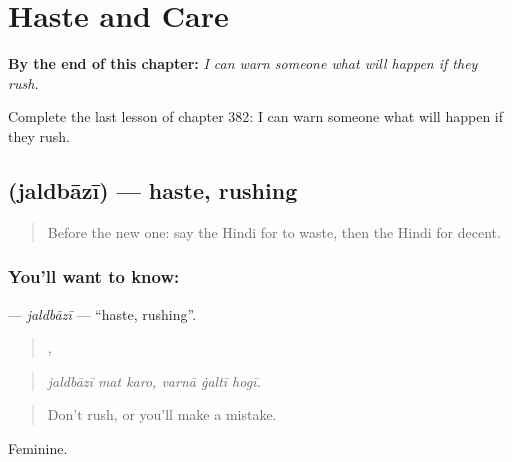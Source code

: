 
\chapter{Haste and Care}
\label{ch:hi-haste-and-care}

\begin{chapteropening}
\textbf{By the end of this chapter:} \emph{I can warn someone what will happen if they rush.}

Complete the last lesson of chapter 382: I can warn someone what will happen if they rush.
\end{chapteropening}

\section[\texorpdfstring{\hi{जल्दबाज़ी} (jaldbāzī)}{जल्दबाज़ी (jaldbāzī)}]{ (jaldbāzī) — haste, rushing}

\label{lesson:HI-C382-jaldbazi}



\begin{quote}
Before the new one: say the Hindi for to waste, then the Hindi for decent.
\end{quote}

\subsection*{You'll want to know: }
\textbf{} — \emph{jaldbāzī} — \textquotedblleft{}haste, rushing\textquotedblright{}.

\begin{quote}
  ,   
\end{quote}

\begin{quote}
\emph{jaldbāzī mat karo, varnā ġaltī hogī.}
\end{quote}

\begin{quote}
Don't rush, or you'll make a mistake.
\end{quote}

Feminine.

